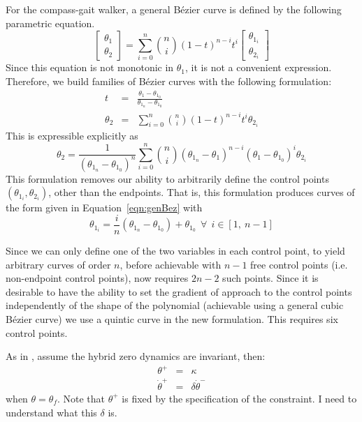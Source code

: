 For the compass-gait walker, a general Bézier curve is defined by the following parametric equation.
\begin{equation}
	\begin{bmatrix}
		\theta_1 \\ \theta_2
	\end{bmatrix}
	=
	\sum_{i=0}^{n}\binom{n}{i}\left(1-t\right)^{n-i}t^i
	\begin{bmatrix}
		\theta_{1_i} \\ \theta_{2_i}
	\end{bmatrix} \label{eqn:genBez}
\end{equation}
Since this equation is not monotonic in $\theta_1$, it is not a convenient expression. Therefore, we build families of Bézier curves with the following formulation:
\begin{eqnarray}
	t &=& \frac{\theta_1 - \theta_{1_0}}{\theta_{1_n} - \theta_{1_0}} \\
	\theta_2 &=& \sum_{i=0}^{n}\binom{n}{i}\left(1-t\right)^{n-i}t^i\theta_{2_i}
\end{eqnarray}
This is expressible explicitly as
\begin{equation}
	\theta_2 = \frac{1}{\left(\theta_{1_n} - \theta_{1_0}\right)^n}\sum_{i=0}^{n}\binom{n}{i}
		\left(\theta_{1_n} - \theta_1\right)^{n-i}
		\left(\theta_1 - \theta_{1_0}\right)^i\theta_{2_i} \label{eqn:expBez}
\end{equation}
This formulation removes our ability to arbitrarily define the control points $\left(\theta_{1_i}, \theta_{2_i}\right)$, other than the endpoints. That is, this formulation produces curves of the form given in Equation~\ref{eqn:genBez} with
\begin{equation}
	\theta_{1_i} = \frac{i}{n}\left(\theta_{1_n}-\theta_{1_0}\right) + \theta_{1_0} ~~
	\forall ~~ i \in \left[1,~n-1\right]
\end{equation}

Since we can only define one of the two variables in each control point, to yield arbitrary curves of order $n$, before achievable with $n - 1$ free control points (i.e. non-endpoint control points), now requires $2n - 2$ such points. Since it is desirable to have the ability to set the gradient of approach to the control points independently of the shape of the polynomial (achievable using a general cubic Bézier curve) we use a quintic curve in the new formulation. This requires six control points. \\ \par

As in \cite{manchester13planning}, assume the hybrid zero dynamics are invariant, then:
\begin{eqnarray}
	\theta^+ &=& \kappa \\
	\dot{\theta}^+ &=& \delta\dot{\theta}^-
\end{eqnarray}
when $\theta = \theta_f$. Note that $\theta^+$ is fixed by the specification of the constraint. I need to understand what this $\delta$ is.\\ \par